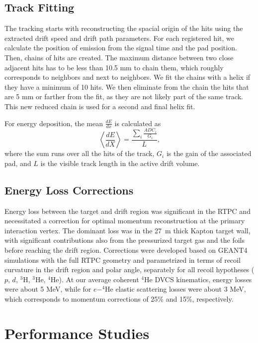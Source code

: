 \documentclass[preprint,5p]{elsarticle}
\begin{document}
\subsection{Track Fitting}\label{sec_rec}

The tracking starts with reconstructing the spacial origin of the hits using 
the extracted drift speed and drift path parameters. For each registered hit, 
we calculate the position of emission from the signal time and the pad 
position. Then, chains of hits are created. The maximum distance between two 
close adjacent hits has to be less than 10.5 mm to chain them, which roughly 
corresponds to neighbors and next to neighbors. We fit the chains with a helix 
if they have a minimum of 10 hits. We then eliminate from the chain the hits 
that are 5 mm or farther from the fit, as they are not likely part of the same 
track. This new reduced chain is used for a second and final helix fit.

For energy deposition, the mean $\frac{dE}{dx}$ is calculated as
\begin{equation}
 \left\langle \frac{dE}{dX} \right\rangle= \frac{\sum\limits_{i} \frac{ADC_{i}}{G_i}}{L},
\end{equation}
where the sum runs over all the hits of the track, $G_{i}$ is the gain of 
the associated pad, and $L$ is the visible track length in the active drift 
volume. 

\subsection{Energy Loss Corrections}\label{sec_eloss}
Energy loss between the target and drift region was significant in the RTPC and 
necessitated a correction for optimal momentum reconstruction at the primary 
interaction vertex.  The dominant loss was in the 27~\textmu{}m thick Kapton target 
wall, with significant contributions also from the pressurized target gas and 
the foils before reaching the drift region.  Corrections were developed based 
on GEANT4 simulations with the full RTPC geometry and parametrized in terms of 
recoil curvature in the drift region and polar angle, separately for all recoil 
hypotheses ($p$, $d$, $^3$H, $^3$He, $^4$He).  At our average coherent $^4$He 
DVCS kinematics, energy losses were about 5 MeV, while for $e-^4$He elastic 
scattering losses were about 3 MeV, which corresponds to momentum corrections 
of 25\% and 15\%, respectively.

\section{Performance Studies}\label{sec_perfor}
\end{document}
